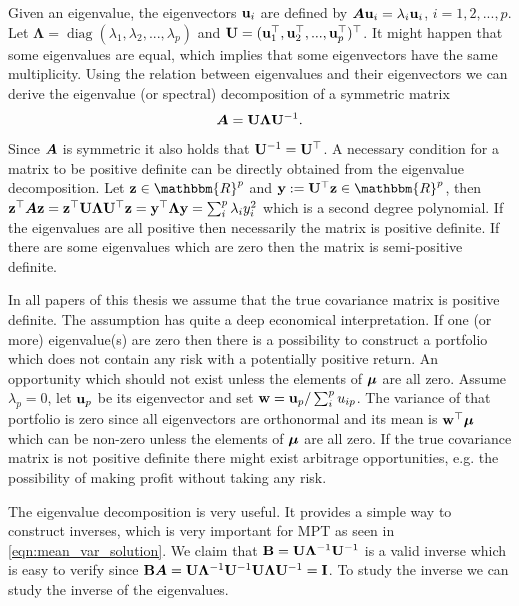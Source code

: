 \documentclass[oneside]{book}\usepackage{knitr}
\begin{document}
Given an eigenvalue, the eigenvectors $\mathbf{u}_i$ are defined by $\mbox{\boldmath$A$} \mathbf{u}_i = \lambda_i \mathbf{u}_i$, $i=1,2,...,p$. 
Let $\boldsymbol{\Lambda} = \operatorname{diag}(\lambda_1, \lambda_2,...,\lambda_p)$ and $\mathbf{U}= (\mathbf{u}_1^\top, \mathbf{u}_2^\top, ..., \mathbf{u}_p^\top)^\top$. It might happen that some eigenvalues are equal, which implies that some eigenvectors have the same multiplicity.
Using the relation between eigenvalues and their eigenvectors we can derive the eigenvalue (or spectral) decomposition of a symmetric matrix 
\begin{equation}\label{eqn:eigenvalue_decomp}
	\mbox{\boldmath$A$} = \mathbf{U} \boldsymbol{\Lambda} \mathbf{U}^{-1}.
\end{equation}
Since $\mbox{\boldmath$A$}$ is symmetric it also holds that $\mathbf{U}^{-1} = \mathbf{U}^\top$.
A necessary condition for a matrix to be positive definite can be directly obtained from the eigenvalue decomposition. 
Let $\bz\in \mathbbm{R}^p$ and $\by := \bU^{\top} \bz \in \mathbbm{R}^p$, then $\mathbf{z}^\top \mbox{\boldmath$A$} \mathbf{z} = \mathbf{z}^\top \mathbf{U} \boldsymbol{\Lambda} \mathbf{U} ^{\top} \mathbf{z} = \mathbf{y}^\top \boldsymbol{\Lambda} \mathbf{y} = \sum_i^p \lambda_i y_i^2$ which is a second degree polynomial. 
If the eigenvalues are all positive then necessarily the matrix is positive definite. 
If there are some eigenvalues which are zero then the matrix is semi-positive definite. 

In all papers of this thesis we assume that the true covariance matrix is positive definite. 
The assumption has quite a deep economical interpretation.
If one (or more) eigenvalue(s) are zero then there is a possibility to construct a portfolio which does not contain any risk with a potentially positive return. 
An opportunity which should not exist unless the elements of $\mbox{\boldmath$\mu$}$ are all zero.
Assume $\lambda_p=0$, let $\mathbf{u}_p$ be its eigenvector and set $\mathbf{w} = \mathbf{u}_p / \sum_i^p u_{ip}$. 
The variance of that portfolio is zero since all eigenvectors are orthonormal and its mean is $\mathbf{w}^\top \mbox{\boldmath$\mu$}$ which can be non-zero unless the elements of $\mbox{\boldmath$\mu$}$ are all zero.
If the true covariance matrix is not positive definite there might exist arbitrage opportunities, e.g. the possibility of making profit without taking any risk.

The eigenvalue decomposition is very useful.
It provides a simple way to construct inverses, which is very important for MPT as seen in \eqref{eqn:mean_var_solution}.
We claim that $\mathbf{B} = \mathbf{U} \boldsymbol{\Lambda}^{-1} \mathbf{U}^{-1}$ is a valid inverse which is easy to verify since $\mathbf{B} \mbox{\boldmath$A$} = \mathbf{U} \boldsymbol{\Lambda}^{-1} \mathbf{U}^{-1} \mathbf{U} \boldsymbol{\Lambda} \mathbf{U}^{-1} = \mathbf{I}$. 
To study the inverse we can study the inverse of the eigenvalues.
\end{document}
